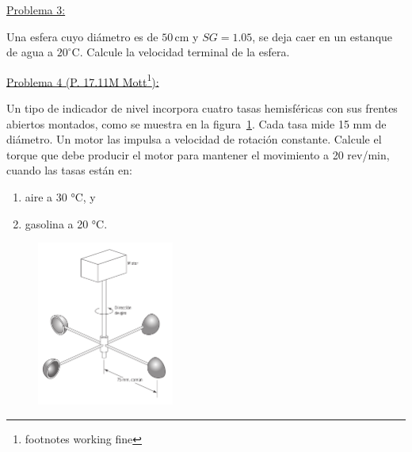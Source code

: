 \documentclass[11pt]{report}
\begin{document}
\newpage

\underline {Problema 3:}
\vspace{0.2cm}

Una esfera cuyo di\'ametro es de $50$\,cm y $SG=1.05$, se deja caer en un estanque de agua a $20^\circ$C. Calcule la velocidad terminal de la esfera.
\vspace{0.2cm}

\underline {Problema 4 (P. 17.11M Mott\footnote{footnotes working fine}):}
\vspace{0.2cm}

Un tipo de indicador de nivel incorpora cuatro tasas hemisféricas con sus frentes abiertos montados, como se muestra en la figura~\ref{fig:fig3}. Cada tasa mide 15 mm de diámetro. Un motor las impulsa a velocidad de rotación constante. Calcule el torque que debe producir el motor para mantener el movimiento a 20 rev/min, cuando las tasas están en:
\begin{enumerate}
\item aire a 30 °C, y
\item gasolina a 20 °C.
\end{enumerate}

\begin{figure}[H]
\centering\includegraphics[width=0.4\textwidth]{Figures/17_11M.png}
\caption{\label{fig:fig3} }
\end{figure}


\end{document}
